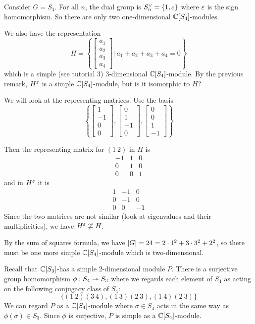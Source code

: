 \begin{exam}
	Consider $G=S_4$.
	For all $n$, the dual group is $S_n^\vee = \{1,\varepsilon\}$ where $\varepsilon$ is the sign homomorphism.
	So there are only two one-dimensional $\mathbb{C}[S_4]$-modules.
	
	We also have the representation
	\[H=\left\{
	\begin{bmatrix}
		a_1 \\ a_2 \\ a_3 \\a_4
	\end{bmatrix}
	\Bigg \vert \
	a_1+a_2+a_3+a_4=0
	\right\}\]
	which is a simple (see tutorial 3) $3$-dimensional $\mathbb{C}[S_4]$-module.
	By the previous remark, $H^\varepsilon$ is a simple $\mathbb{C}[S_4]$-module, but is it isomorphic to $H$?
	
	We will look at the representing matrices.
	Use the basis
	\[\left\{
	\begin{bmatrix}
		1 \\ -1 \\ 0 \\0
	\end{bmatrix},
	\begin{bmatrix}
	0 \\1 \\ -1 \\ 0
	\end{bmatrix},
	\begin{bmatrix}
	0 \\ 0 \\ 1 \\ -1
	\end{bmatrix}
	\right\}\]
	
	Then the representing matrix for $(1\ 2)$ in $H$ is
	\[\begin{matrix}
		-1 & 1 & 0 \\
		0 & 1 & 0 \\
		0 & 0 & 1
	\end{matrix}\]
	and in $H^\varepsilon$ it is	
	\[\begin{matrix}
		1 & -1 & 0 \\
		0 & -1 & 0 \\
		0 & 0 & -1
	\end{matrix}\]
	Since the two matrices are not similar (look at eigenvalues and their multiplicities), we have $H^\varepsilon \not\cong H$.
	
	By the sum of squares formula, we have $\left\lvert G \right\rvert=24=2 \cdot 1^2 + 3 \cdot 3^2 + 2^2$, so there must be one more simple $\mathbb{C}[S_4]$-module which is two-dimensional.
	
	Recall that $\mathbb{C}[S_3]$-has a simple $2$-dimensional module $P$.
	There is a surjective group homomorphism $\phi: S_4 \twoheadrightarrow S_3$ where we regards each element of $S_4$ as acting on the following conjugacy class of $S_4$:
	\[\{(1\ 2)(3\ 4), (1\ 3)(2\ 3), (1\ 4)(2\ 3)\}\]
	We can regard $P$ as a $\mathbb{C}[S_4]$-module where $\sigma \in S_4$ acts in the same way as $\phi(\sigma) \in S_3$.
	Since $\phi$ is surjective, $P$ is simple as a $\mathbb{C}[S_4]$-module.
\end{exam}